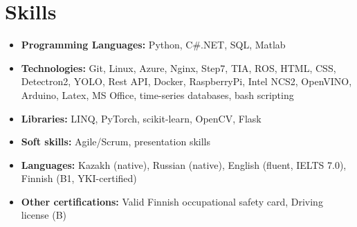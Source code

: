\documentclass[a4paper,10pt]{article}
\begin{document}
\section*{Skills}
\begin{itemize}
    \item \textbf{Programming Languages:} Python, C\#.NET, SQL, Matlab
    \item \textbf{Technologies:} Git, Linux,  Azure, Nginx, Step7, TIA, ROS, HTML, CSS, Detectron2, YOLO, Rest API, Docker, RaspberryPi, Intel NCS2, OpenVINO, Arduino, Latex, MS Office, time-series databases, bash scripting
    \item \textbf{Libraries:} LINQ, PyTorch, scikit-learn, OpenCV, Flask
    \item \textbf{Soft skills:} Agile/Scrum, presentation skills
    \item \textbf{Languages:} Kazakh (native), Russian (native), English (fluent, IELTS 7.0), Finnish (B1, YKI-certified)
    \item \textbf{Other certifications:} Valid Finnish occupational safety card, Driving license (B)
\end{itemize}
\end{document}
